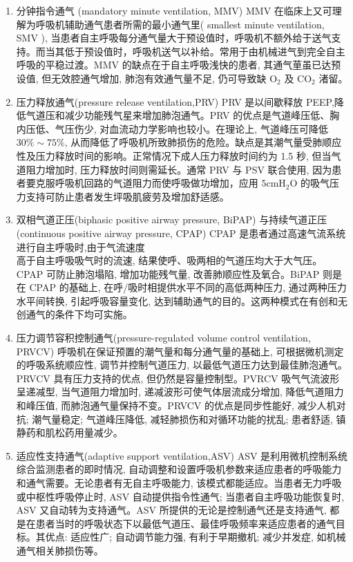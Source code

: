 \documentclass[10pt]{article}
\begin{document}
\begin{enumerate}
  \item 分钟指令通气 (mandatory minute ventilation, MMV) MMV 在临床上又可理解为呼吸机辅助通气患者所需的最小通气里( smallest minute ventilation, SMV ), 当患者自主呼吸每分通气量大于预设值时，呼吸机不额外给于送气支持。而当其低于预设值时，呼吸机送气以补给。常用于由机械进气到完全自主呼吸的平稳过渡。MMV 的缺点在于自主呼吸浅快的患者, 其通气荲虽已达预设值, 但无效腔通气增加, 肺泡有效通气量不足, 仍可导致缺 $\mathrm{O}_{2}$ 及 $\mathrm{CO}_{2}$ 渚留。

  \item 压力释放通气(pressure release ventilation,PRV) PRV 是以间歇释放 PEEP,降低气道压和减少功能残气星来增加肺泡通气。PRV 的优点是气道峰压低、胸内压低、气压伤少, 对血流动力学影响也较小。在理论上, 气道峰压可降低 $30 \% \sim 75 \%$, 从而降低了呼吸机所致肺损伤的危险。缺点是其潮气量受肺顺应性及压力释放时间的影响。正常情况下成人压力释放时间约为 1.5 秒, 但当气道阻力增加时, 压力释放时间则需延长。通常 PRV 与 PSV 联合使用, 因为患者要克服呼吸机回路的气道阻力而使呼吸做功增加，应用 $5 \mathrm{cmH}_{2} \mathrm{O}$ 的吸气压力支持可防止患者发生坪吸肌疲劳及增加舒适感。

  \item 双相气道正压(biphasic positive airway pressure, BiPAP) 与持续气道正压 (continuous positive airway pressure, CPAP) CPAP 是患者通过高速气流系统进行自主呼吸时,由于气流速度\\
高于自主呼吸吸气时的流速, 结果使呼、吸两相的气道压均大于大气压。CPAP 可防止肺泡塌陷, 增加功能残气量, 改善肺顺应性及氧合。BiPAP 则是在 CPAP 的基础上, 在呼/吸时相提供水平不同的高低两种压力, 通过两种压力水平间转换, 引起呼吸容量变化, 达到辅助通气的目的。这两种模式在有创和无创通气的条件下均可实施。

  \item 压力调节容积控制通气(pressure-regulated volume control ventilation, PRVCV) 呼吸机在保证预置的潮气量和每分通气量的基础上, 可根据微机测定的呼吸系统顺应性, 调节并控制气道压力, 以最低气道压力达到最佳肺泡通气。PRVCV 具有压力支持的优点, 但仍然是容量控制型。PVRCV 吸气气流波形呈递减型, 当气道阻力增加时, 递减波形可使气体层流成分增加, 降低气道阻力和峰压值, 而肺泡通气量保持不变。PRVCV 的优点是同步性能好, 减少人机对抗; 潮气量稳定; 气道峰压降低, 减轻肺损伤和对循环功能的扰乱; 患者舒适, 镇静药和肌松药用量减少。

  \item 适应性支持通气(adaptive support ventilation,ASV) ASV 是利用微机控制系统综合监测患者的即时情况, 自动调整和设置呼吸机参数来适应患者的呼吸能力和通气需要。无论患者有无自主呼吸能力, 该模式都能适应。当患者无力呼吸或中枢性呼吸停止时, ASV 自动提供指令性通气; 当患者自主呼吸功能恢复时, ASV 又自动转为支持通气。ASV 所提供的无论是控制通气还是支持通气, 都是在患者当时的呼吸状态下以最低气道压、最佳呼吸频率来适应患者的通气目标。其优点: 适应性广; 自动调节能力强, 有利于早期撤机; 减少并发症, 如机械通气相关肺损伤等。

\end{enumerate}
\end{document}
